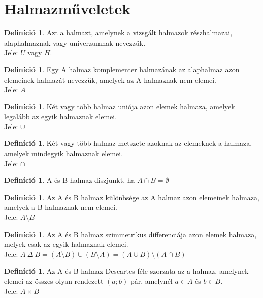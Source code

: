 \documentclass[twoside,12pt]{report}
\theoremstyle{definition}
\newtheorem{definition}[theorem]{Definíció}
\begin{document}
\section{Halmazműveletek}
	\begin{definition}
		Azt a halmazt, amelynek a vizsgált halmazok részhalmazai, alaphalmaznak vagy
		univerzumnak nevezzük.\\
		Jele: $U$ vagy $H$.
	\end{definition}
	\begin{definition}
		Egy A halmaz komplementer halmazának az alaphalmaz azon elemeinek halmazát
		nevezzük, amelyek az A halmaznak nem elemei.\\
		Jele: $\overline{A}$
	\end{definition}
	\begin{definition}
		Két vagy több halmaz uniója azon elemek halmaza, amelyek legalább az egyik halmaznak elemei.\\
		Jele: $\cup$
	\end{definition}
	\begin{definition}
		Két vagy több halmaz metszete azoknak az elemeknek a halmaza, amelyek mindegyik halmaznak elemei.\\
		Jele: $\cap$
	\end{definition}
	\begin{definition}
		A és B halmaz diszjunkt, ha $A\cap B=\emptyset$
	\end{definition}
	\begin{definition}
		Az A és B halmaz különbsége az A halmaz azon elemeinek halmaza, amelyek a B halmaznak nem elemei.\\
		Jele: $A\setminus B$
	\end{definition}
	\begin{definition}
		Az A és B halmaz szimmetrikus differenciája azon elemek halmaza, melyek csak az egyik halmaznak elemei.\\
		Jele: $A\ \Delta\ B=(A\setminus B)\cup(B\setminus A)=(A\cup B)\setminus(A\cap B)$
	\end{definition}
	\begin{definition}
		Az A és B halmaz Descartes-féle szorzata az a halmaz, amelynek elemei az összes
		olyan rendezett $(a; b)$ pár, amelynél $a\in A$ és $b\in B$.\\
		Jele: $A \times B$
	\end{definition}
	\noindent
\end{document}
